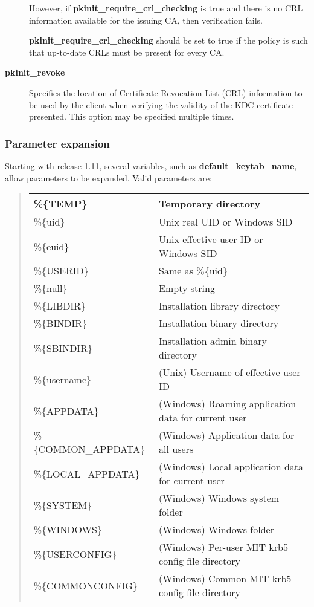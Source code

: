 \documentclass[letterpaper,10pt,english]{sphinxmanual}
\begin{document}
\begin{description}
However, if \textbf{pkinit\_require\_crl\_checking} is true and there is
no CRL information available for the issuing CA, then verification
fails.

\textbf{pkinit\_require\_crl\_checking} should be set to true if the
policy is such that up-to-date CRLs must be present for every CA.

\item[{\textbf{pkinit\_revoke}}] \leavevmode
Specifies the location of Certificate Revocation List (CRL)
information to be used by the client when verifying the validity
of the KDC certificate presented.  This option may be specified
multiple times.

\end{description}


\subsubsection{Parameter expansion}
\label{admin/conf_files/krb5_conf:id7}\label{admin/conf_files/krb5_conf:parameter-expansion}
Starting with release 1.11, several variables, such as
\textbf{default\_keytab\_name}, allow parameters to be expanded.
Valid parameters are:
\begin{quote}

\begin{tabulary}{\linewidth}{|L|L|}
\hline

\%\{TEMP\}
 & 
Temporary directory
\\
\hline
\%\{uid\}
 & 
Unix real UID or Windows SID
\\
\hline
\%\{euid\}
 & 
Unix effective user ID or Windows SID
\\
\hline
\%\{USERID\}
 & 
Same as \%\{uid\}
\\
\hline
\%\{null\}
 & 
Empty string
\\
\hline
\%\{LIBDIR\}
 & 
Installation library directory
\\
\hline
\%\{BINDIR\}
 & 
Installation binary directory
\\
\hline
\%\{SBINDIR\}
 & 
Installation admin binary directory
\\
\hline
\%\{username\}
 & 
(Unix) Username of effective user ID
\\
\hline
\%\{APPDATA\}
 & 
(Windows) Roaming application data for current user
\\
\hline
\%\{COMMON\_APPDATA\}
 & 
(Windows) Application data for all users
\\
\hline
\%\{LOCAL\_APPDATA\}
 & 
(Windows) Local application data for current user
\\
\hline
\%\{SYSTEM\}
 & 
(Windows) Windows system folder
\\
\hline
\%\{WINDOWS\}
 & 
(Windows) Windows folder
\\
\hline
\%\{USERCONFIG\}
 & 
(Windows) Per-user MIT krb5 config file directory
\\
\hline
\%\{COMMONCONFIG\}
 & 
(Windows) Common MIT krb5 config file directory
\\
\hline\end{tabulary}

\end{quote}
\end{document}
